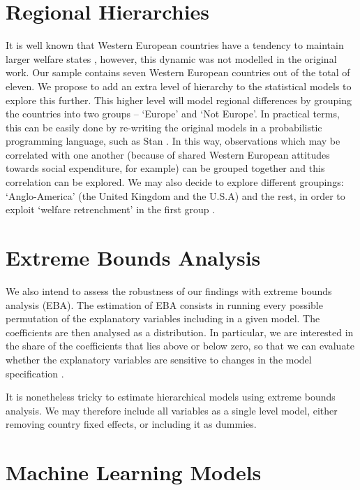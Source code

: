 \documentclass[a4paper,12pt]{article}
\begin{document}
\section{Regional Hierarchies}
It is well known that Western European countries have a tendency to maintain larger welfare states \citep{ebbinghaus2001comparing}, however, this dynamic was not modelled in the original work. Our sample contains seven Western European countries out of the total of eleven. We propose to add an extra level of hierarchy to the statistical models to explore this further. This higher level will model regional differences by grouping the countries into two groups -- `Europe' and `Not Europe'. In practical terms, this can be easily done by re-writing the original models in a probabilistic programming language, such as Stan \citep{carpenter2017stan}. In this way, observations which may be correlated with one another (because of shared Western European attitudes towards social expenditure, for example) can be grouped together and this correlation can be explored. We may also decide to explore different groupings: `Anglo-America' (the United Kingdom and the U.S.A) and the rest, in order to exploit `welfare retrenchment' in the first group \citep{ebbinghaus2001comparing}.

\section{Extreme Bounds Analysis}

We also intend to assess the robustness of our findings with extreme bounds analysis (EBA). The estimation of EBA consists in running every possible permutation of the explanatory variables including in a given model. The coefficients are then analysed as a distribution. In particular, we are interested in the share of the coefficients that lies above or below zero, so that we can evaluate whether the explanatory variables are sensitive to changes in the model specification \citep{leamer1985sensitivity,sala1997just}. 

It is nonetheless tricky to estimate hierarchical models using extreme bounds analysis. We may therefore include all variables as a single level model, either removing country fixed effects, or including it as dummies.

\section{Machine Learning Models}
\end{document}
